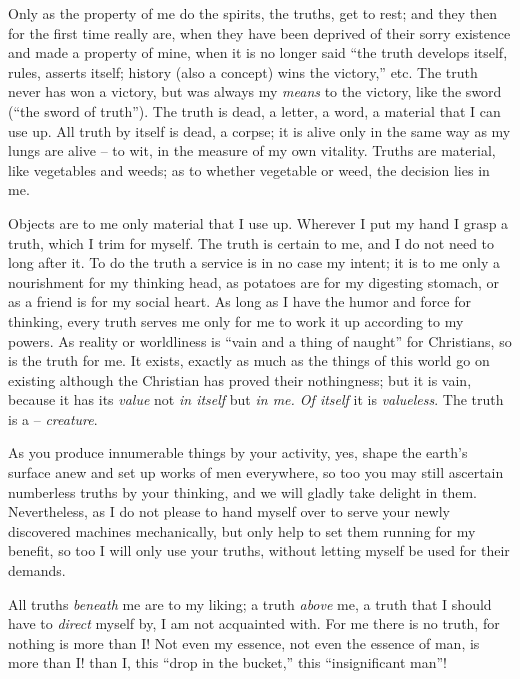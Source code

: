 \documentclass[12pt,a4paper]{book}
\begin{document}
Only as the property of me do the spirits, the truths, get to rest; and they 
then for the first time really are, when they have been deprived of their 
sorry existence and made a property of mine, when it is no longer said ``the 
truth develops itself, rules, asserts itself; history (also a concept) wins 
the victory,'' etc. The truth never has won a victory, but was always my 
\textit{means} to the victory, like the sword (``the sword of truth''). The 
truth is dead, a letter, a word, a material that I can use up. All truth by 
itself is dead, a corpse; it is alive only in the same way as my lungs are 
alive -- to wit, in the measure of my own vitality. Truths are material, like 
vegetables and weeds; as to whether vegetable or weed, the decision lies in 
me.

Objects are to me only material that I use up. Wherever I put my hand I grasp 
a truth, which I trim for myself. The truth is certain to me, and I do not 
need to long after it. To do the truth a service is in no case my intent; it 
is to me only a nourishment for my thinking head, as potatoes are for my 
digesting stomach, or as a friend is for my social heart. As long as I have 
the humor and force for thinking, every truth serves me only for me to work it 
up according to my powers. As reality or worldliness is ``vain and a thing of 
naught'' for Christians, so is the truth for me. It exists, exactly as much 
as the things of this world go on existing although the Christian has proved 
their nothingness; but it is vain, because it has its \textit{value} not 
\textit{in itself} but \textit{in me. Of itself} it is \textit{valueless}. The 
truth is a -- \textit{creature}.

As you produce innumerable things by your activity, yes, shape the earth's 
surface anew and set up works of men everywhere, so too you may still 
ascertain numberless truths by your thinking, and we will gladly take delight 
in them. Nevertheless, as I do not please to hand myself over to serve your 
newly discovered machines mechanically, but only help to set them running for 
my benefit, so too I will only use your truths, without letting myself be used 
for their demands.

All truths \textit{beneath} me are to my liking; a truth \textit{above} me, a 
truth that I should have to \textit{direct} myself by, I am not acquainted 
with. For me there is no truth, for nothing is more than I! Not even my 
essence, not even the essence of man, is more than I! than I, this ``drop in 
the bucket,'' this ``insignificant man''!
\end{document}
